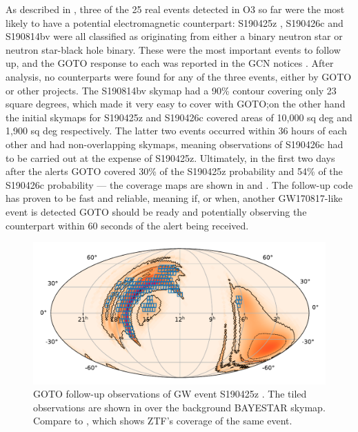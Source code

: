 \begin{colsection}
As described in , three of the 25 real events detected in O3 so far were the most likely to have a potential electromagnetic counterpart: S190425z \citep{S190425z}, S190426c \citep{S190426c} and S190814bv \citep{S190814bv} were all classified as originating from either a binary neutron star or neutron star-black hole binary. These were the most important events to follow up, and the GOTO response to each was reported in the GCN notices \citet{S190425z_GOTO, S190426c_GOTO, S190814bv_GOTO}. After analysis, no counterparts were found for any of the three events, either by GOTO or other projects. The S190814bv skymap had a 90\% contour covering only 23 square degrees, which made it very easy to cover with GOTO;\@ on the other hand the initial skymaps for S190425z and S190426c covered areas of 10,000 sq deg and 1,900 sq deg respectively. The latter two events occurred within 36 hours of each other and had non-overlapping skymaps, meaning observations of S190426c had to be carried out at the expense of S190425z. Ultimately, in the first two days after the alerts GOTO covered 30\% of the S190425z probability \citep{S190425z_GOTO} and 54\% of the S190426c probability \citep{S190426c_GOTO} --- the coverage maps are shown in  and . The follow-up code has proven to be fast and reliable, meaning if, or when, another GW170817-like event is detected GOTO should be ready and potentially observing the counterpart within 60 seconds of the alert being received.

\begin{figure}[p]
    \begin{center}
        \includegraphics[width=0.9\linewidth]{images/190425_goto.pdf}
    \end{center}
    \caption[Follow-up observations of S190425z with GOTO]{
        GOTO follow-up observations of GW event S190425z \citep{S190425z_GOTO}. The tiled observations are shown in  over the background BAYESTAR skymap. Compare to , which shows ZTF's coverage of the same event.
        }\label{fig:190425_goto}
\end{figure}


\end{colsection}
